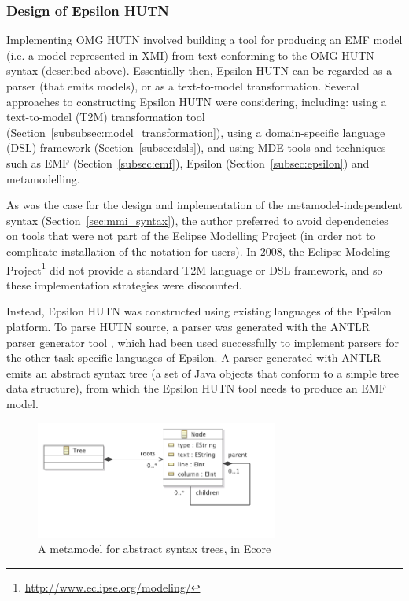 \subsubsection{Design of Epsilon HUTN}
Implementing OMG HUTN involved building a tool for producing an EMF model (i.e. a model represented in XMI) from text conforming to the OMG HUTN syntax (described above). Essentially then, Epsilon HUTN can be regarded as a parser (that emits models), or as a text-to-model transformation. Several approaches to constructing Epsilon HUTN were considering, including: using a text-to-model (T2M) transformation tool (Section~\ref{subsubsec:model_transformation}), using a domain-specific language (DSL) framework (Section~\ref{subsec:dsls}), and using MDE tools and techniques such as EMF (Section~\ref{subsec:emf}), Epsilon (Section~\ref{subsec:epsilon}) and metamodelling.

As was the case for the design and implementation of the metamodel-independent syntax (Section~\ref{sec:mmi_syntax}), the author preferred to avoid dependencies on tools that were not part of the Eclipse Modelling Project (in order not to complicate installation of the notation for users). In 2008, the Eclipse Modeling Project\footnote{\url{http://www.eclipse.org/modeling/}} did not provide a standard T2M language or DSL framework, and so these implementation strategies were discounted.

Instead, Epsilon HUTN was constructed using existing languages of the Epsilon platform. To parse HUTN source, a parser was generated with the ANTLR parser generator tool \cite{parr07antlr}, which had been used successfully to implement parsers for the other task-specific languages of Epsilon. A parser generated with ANTLR emits an abstract syntax tree (a set of Java objects that conform to a simple tree data structure), from which the Epsilon HUTN tool needs to produce an EMF model.

\begin{figure}[htbp]
  \centering
  \includegraphics[width=8cm]{5.Implementation/images/ast_metamodel.pdf}
  \caption{A metamodel for abstract syntax trees, in Ecore}
  \label{fig:ast_metamodel}
\end{figure}

